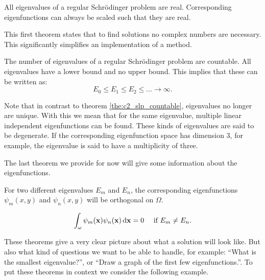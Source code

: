 \begin{theorem}\label{the:c3_real_eigenvalues}
    All eigenvalues of a regular Schrödinger problem are real. Corresponding eigenfunctions can always be scaled such that they are real.
\end{theorem}

This first theorem states that to find solutions no complex numbers are necessary. This significantly simplifies an implementation of a method.

\begin{theorem}\label{the:c3_eigs_countable}
    The number of eigenvalues of a regular Schrödinger problem are countable. All eigenvalues have a lower bound and no upper bound. This implies that these can be written as:
    $$
        E_0 \leq E_1 \leq E_2 \leq \dots \to \infty \text{.}
    $$
\end{theorem}

Note that in contrast to theorem \ref{the:c2_slp_countable}, eigenvalues no longer are unique. With this we mean that for the same eigenvalue, multiple linear independent eigenfunctions can be found. These kinds of eigenvalues are said to be degenerate. If the corresponding eigenfunction space has dimension $3$, for example, the eigenvalue is said to have a multiplicity of three.

The last theorem we provide for now will give some information about the eigenfunctions.

\begin{theorem}\label{the:c3_eigs_othogonal}
    For two different eigenvalues $E_m$ and $E_n$, the corresponding eigenfunctions $\psi_m(x, y)$ and $\psi_n(x, y)$ will be orthogonal on $\Omega$.

    $$
        \int_\omega \psi_m(\vb{x}) \psi_n(\vb{x}) \, \dd \vb{x} = 0 \quad \text{ if $E_m \neq E_n$.}
    $$
\end{theorem}

These theorems give a very clear picture about what a solution will look like. But also what kind of questions we want to be able to handle, for example: ``What is the smallest eigenvalue?'', or ``Draw a graph of the first few eigenfunctions.''. To put these theorems in context we consider the following example.

